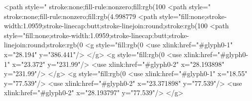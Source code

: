 <path style=" stroke:none;fill-rule:nonzero;fill:rgb(100%
<path style=" stroke:none;fill-rule:nonzero;fill:rgb(4.998779%
<path style="fill:none;stroke-width:1.0959;stroke-linecap:butt;stroke-linejoin:round;stroke:rgb(100%
<path style="fill:none;stroke-width:1.0959;stroke-linecap:butt;stroke-linejoin:round;stroke:rgb(0%
<g style="fill:rgb(0%
  <use xlink:href="#glyph0-1" x="28.194" y="386.441"/>
</g>
<g style="fill:rgb(0%
  <use xlink:href="#glyph0-1" x="23.372" y="231.99"/>
  <use xlink:href="#glyph0-2" x="28.193898" y="231.99"/>
</g>
<g style="fill:rgb(0%
  <use xlink:href="#glyph0-1" x="18.55" y="77.539"/>
  <use xlink:href="#glyph0-2" x="23.371898" y="77.539"/>
  <use xlink:href="#glyph0-2" x="28.193797" y="77.539"/>
</g>
